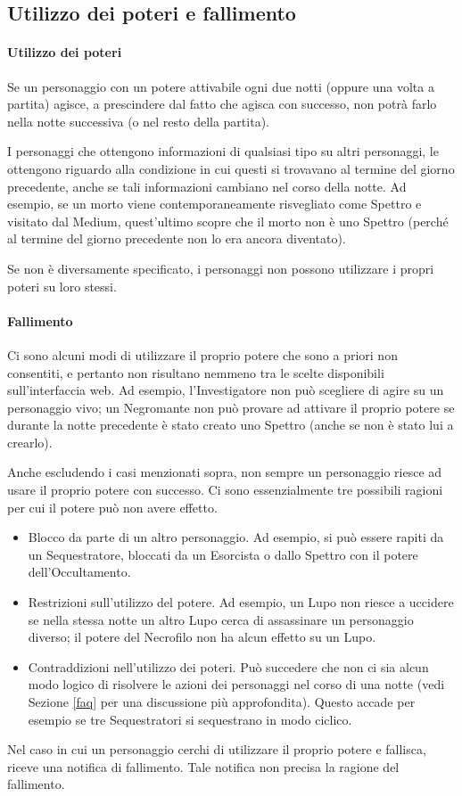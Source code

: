 \documentclass[a4paper,10pt]{article}
\begin{document}
\subsection{Utilizzo dei poteri e fallimento}
\label{fallimento}

\paragraph{Utilizzo dei poteri} 
Se un personaggio con un potere attivabile ogni due notti (oppure una volta a
partita) agisce, a prescindere dal fatto che agisca con successo, non potrà
farlo nella notte successiva (o nel resto della partita).

I personaggi che ottengono informazioni di qualsiasi tipo su altri personaggi,
le ottengono riguardo alla condizione in cui questi si trovavano al termine del
giorno precedente, anche se tali informazioni cambiano nel corso della notte.
Ad esempio, se un morto viene contemporaneamente risvegliato come Spettro e
visitato dal Medium, quest'ultimo scopre che il morto non è uno Spettro (perché
al termine del giorno precedente non lo era ancora diventato).

Se non è diversamente specificato, i personaggi non possono utilizzare i propri
poteri su loro stessi.

\paragraph{Fallimento} Ci sono alcuni modi di utilizzare il proprio potere che
sono a priori non consentiti, e pertanto non risultano nemmeno tra le scelte
disponibili sull'interfaccia web. Ad esempio, l'Investigatore non può scegliere
di agire su un personaggio vivo; un Negromante non può provare ad
attivare il proprio potere se durante la notte precedente è stato creato uno
Spettro (anche se non è stato lui a crearlo).

Anche escludendo i casi menzionati sopra, non sempre un personaggio riesce ad
usare il proprio potere con successo.
Ci sono essenzialmente tre possibili ragioni per cui il potere può non avere
effetto.
\begin{itemize}
 \item Blocco da parte di un altro personaggio. Ad esempio, si può essere rapiti
da un Sequestratore, bloccati da un Esorcista o dallo Spettro con il potere
dell'Occultamento.
 \item Restrizioni sull'utilizzo del potere. Ad esempio, un Lupo non riesce a
uccidere se nella stessa notte un altro Lupo cerca di assassinare un personaggio
diverso; il potere del Necrofilo non ha alcun effetto su un Lupo.
 \item Contraddizioni nell'utilizzo dei poteri. Può succedere che non ci sia
alcun modo logico di risolvere le azioni dei personaggi nel corso di una notte
(vedi Sezione \ref{faq} per una discussione più approfondita). Questo accade per
esempio se tre Sequestratori si sequestrano in modo ciclico.
\end{itemize}
Nel caso in cui un personaggio cerchi di utilizzare il proprio potere e
fallisca, riceve una notifica di fallimento. Tale notifica non precisa la
ragione del fallimento.
\end{document}
